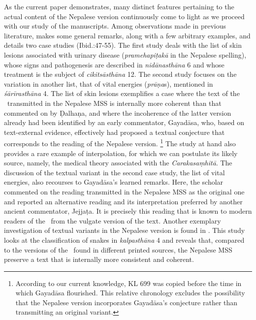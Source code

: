 As the current paper demonstrates, many distinct features pertaining to the actual content of the Nepalese version continuously come to light as we proceed with our study of the manuscripts. Among observations made in previous literature, \citet[44-47]{kleb-2021b} makes some general remarks, along with a few arbitrary examples, and details two case studies (Ibid.:47-55). The first study deals with the list of skin lesions associated with urinary disease (\emph{pramehapiṭakā} in the Nepalese spelling), whose signs and pathogenesis are described in \emph{nidānasthāna} 6 and whose treatment is the subject of \emph{cikitsāsthāna} 12. The second study focuses on the variation in another list, that of vital energies (\emph{prāṇa}s), mentioned in \emph{śārīrasthāna} 4. The list of skin lesions exemplifies a case where the text of the \SS\ transmitted in the Nepalese MSS is internally more coherent than that commented on by Ḍalhaṇa, and where the incoherence of the latter version already had been identified by an early commentator, Gayadāsa, who, based on text-external evidence, effectively had proposed a textual conjecture that corresponds to the reading of the Nepalese version.%
    \footnote{%
    According to our current knowledge, KL 699 was copied before the time in which Gayadāsa flourished. This relative chronology excludes the possibility that the Nepalese version incorporates Gayadāsa's conjecture rather than transmitting an original variant.%
    }
The study at hand also provides a rare example of interpolation, for which we can postulate its likely source, namely, the medical theory associated with the \textit{Carakasaṃhitā}.
The discussion of the textual variant in the second case study, the list of vital energies, also recourses to Gayadāsa's learned remarks. Here, the scholar commented on the reading transmitted in the Nepalese MSS as the original one and reported an alternative reading and its interpretation preferred by another ancient commentator, Jejjaṭa. It is precisely this reading that is known to modern readers of the \SS\ from the vulgate version of the text.
Another exemplary investigation of textual variants in the Nepalese version is found in \citet[101–104]{hari-2011}.
This study looks at the classification of snakes in \emph{kalpasthāna} 4 and reveals that, compared to the versions of the \SS\ found in different printed sources, the Nepalese MSS preserve a text that is internally more consistent and coherent. 

